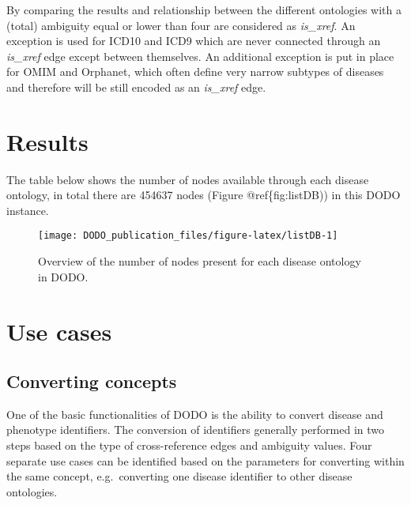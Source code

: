 \documentclass[9pt,a4paper,]{extarticle}
\begin{document}
By comparing the results and relationship between the different ontologies with a (total) ambiguity equal or lower than four are considered as \emph{is\_xref}. An exception is used for ICD10 and ICD9 which are never connected through an \emph{is\_xref} edge except between themselves. An additional exception is put in place for OMIM and Orphanet, which often define very narrow subtypes of diseases and therefore will be still encoded as an \emph{is\_xref} edge.

\hypertarget{results}{%
\section{Results}\label{results}}

The table below shows the number of nodes available through each disease ontology, in total there are 454637 nodes (Figure @ref\{fig:listDB)) in this DODO instance.

\begin{figure}

{\centering \texttt{[image: DODO\_publication\_files/figure-latex/listDB-1]} 

}

\caption{Overview of the number of nodes present for each disease ontology in DODO.}\label{fig:listDB}
\end{figure}

\hypertarget{use-cases}{%
\section{Use cases}\label{use-cases}}

\hypertarget{converting-concepts}{%
\subsection{Converting concepts}\label{converting-concepts}}

One of the basic functionalities of DODO is the ability to convert disease and phenotype identifiers. The conversion of identifiers generally performed in two steps based on the type of cross-reference edges and ambiguity values. Four separate use cases can be identified based on the parameters for converting within the same concept, e.g.~converting one disease identifier to other disease ontologies.
\end{document}
